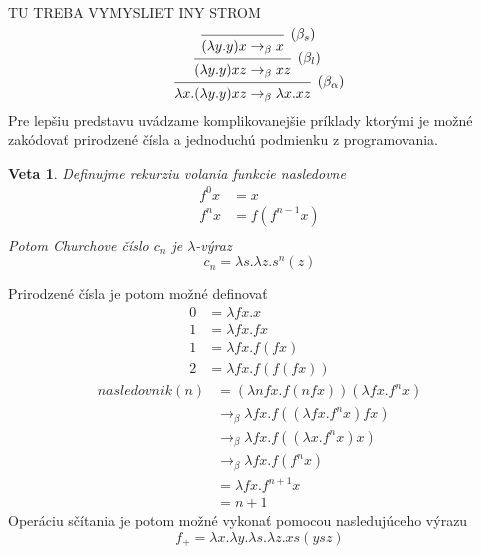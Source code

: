 \documentclass[a4paper,10pt,oneside]{report}%
\newtheorem{theorem}{Veta}[chapter]
\begin{document}
TU TREBA VYMYSLIET INY STROM
\begin{equation}
    \begin{prooftree}
        \infer0[($\beta_{s}$)]{(\lambda y.y)x \to_{\beta} x}
        \infer1[($\beta_{l}$)]{(\lambda y.y)xz \to_{\beta} xz}
        \infer1[($\beta_{\alpha}$)]{\lambda x.(\lambda y.y)xz \to_{\beta} \lambda x . xz}
    \end{prooftree}
\end{equation}
    Pre lepšiu predstavu uvádzame komplikovanejšie príklady ktorými je možné
zakódovať prirodzené čísla a jednoduchú podmienku z programovania.
\begin{theorem}
    Definujme rekurziu volania funkcie nasledovne
    \begin{align*}
        f^{0}x &= x \\
        f^{n}x &= f(f^{n-1}x) \\
    \end{align*}
    Potom Churchove číslo $c_{n}$ je $\lambda$-výraz
    \begin{equation*}
        c_{n} = \lambda s . \lambda z . s^{n} (z)
    \end{equation*}
\end{theorem}
    Prirodzené čísla je potom možné definovať
\begin{align*}
    0 &= \lambda f x . x \\
    1 &= \lambda f x . f x \\
    1 &= \lambda f x . f (f x) \\
    2 &= \lambda f x . f ( f (f x))
\end{align*}
\begin{align*}
    nasledovnik(n) &=           (\lambda n f x .  f( n f x ))(\lambda f x . f^{n} x) \\
                   &\to_{\beta} \lambda f x . f (( \lambda f x . f^{n} x ) f x)      \\
                   &\to_{\beta} \lambda f x . f (( \lambda x . f^{n} x) x)           \\
                   &\to_{\beta} \lambda f x . f (f^{n} x)                            \\
                   &=           \lambda f x . f^{n+1} x                              \\
                   &= n + 1
\end{align*}
    Operáciu sčítania je potom možné vykonať pomocou nasledujúceho výrazu
\begin{equation*}
    f_{+} = \lambda x. \lambda y. \lambda s. \lambda z. x s (y s z)
\end{equation*}
\end{document}
